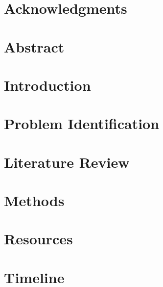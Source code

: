 \documentclass[12pt]{article}
\begin{document}

\restoregeometry

\section*{Acknowledgments}

\pagebreak

\setcounter{tocdepth}{5}
\tableofcontents
\pagebreak

\listoffigures
\listoftables
\pagebreak

\justify

\section*{Abstract}

\pagebreak

\section{Introduction}


\section{Problem Identification}


\section{Literature Review}


\section{Methods}


\section{Resources}


\section{Timeline}


%
\end{document}

